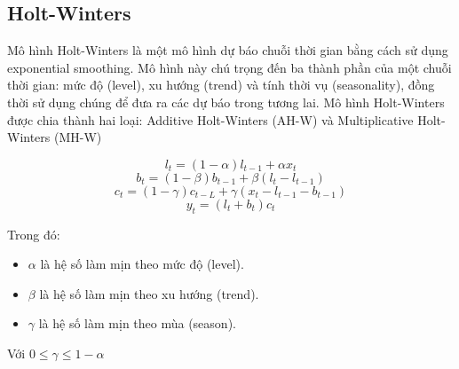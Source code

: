 \subsection{Holt-Winters}
Mô hình Holt-Winters là một mô hình dự báo chuỗi thời gian bằng cách sử dụng exponential smoothing. Mô hình này chú trọng đến ba thành phần của một chuỗi thời gian: mức độ (level), xu hướng (trend) và tính thời vụ (seasonality), đồng thời sử dụng chúng để đưa ra các dự báo trong tương lai.
Mô hình Holt-Winters được chia thành hai loại: Additive Holt-Winters (AH-W) và Multiplicative Holt-Winters (MH-W)

\[
l_{t} = (1 - \alpha)l_{t - 1} + \alpha x_{t}
\]
\[
b_{t} = (1 - \beta)b_{t - 1} + \beta (l_{t} - l_{t - 1})
\]
\[
c_{t} = (1 - \gamma)c_{t - L} + \gamma (x_{t} - l_{t - 1} - b_{t - 1})
\]
\[
y_{t} = (l_{t} + b_{t})c_{t}
\]

Trong đó:
\begin{itemize}
    \item \(\alpha\) là hệ số làm mịn theo mức độ (level).
    \item \(\beta\) là hệ số làm mịn theo xu hướng (trend).
    \item \(\gamma\) là hệ số làm mịn theo mùa (season).
\end{itemize}
Với \(0 \leq \gamma \leq 1-\alpha\)